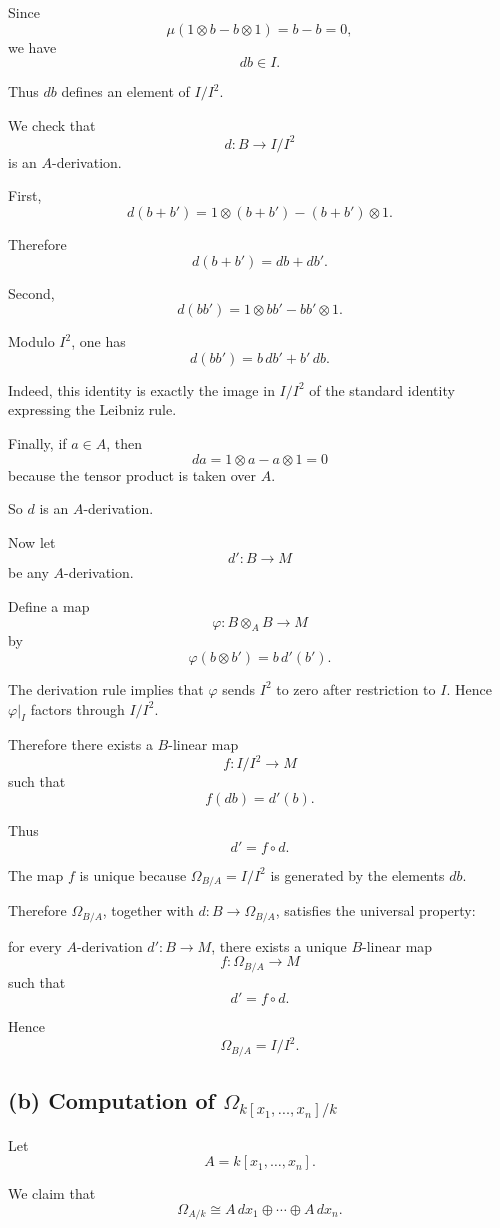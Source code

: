 \documentclass[12pt,a4paper]{article}
\theoremstyle{notespace}
\begin{document}
Since
\[
\mu(1\otimes b-b\otimes1)=b-b=0,
\]
we have
\[
db\in I.
\]

Thus \(db\) defines an element of \(I/I^2\).

We check that
\[
d:B\to I/I^2
\]
is an \(A\)-derivation.

First,
\[
d(b+b')
=
1\otimes(b+b')-(b+b')\otimes1.
\]

Therefore
\[
d(b+b')=db+db'.
\]

Second,
\[
d(bb')
=
1\otimes bb'-bb'\otimes1.
\]

Modulo \(I^2\), one has
\[
d(bb')=b\,db'+b'\,db.
\]

Indeed, this identity is exactly the image in \(I/I^2\) of the standard
identity expressing the Leibniz rule.

Finally, if \(a\in A\), then
\[
da=1\otimes a-a\otimes1=0
\]
because the tensor product is taken over \(A\).

So \(d\) is an \(A\)-derivation.

Now let
\[
d':B\to M
\]
be any \(A\)-derivation.

Define a map
\[
\varphi:B\otimes_A B\to M
\]
by
\[
\varphi(b\otimes b')=b\,d'(b').
\]

The derivation rule implies that \(\varphi\) sends \(I^2\) to zero after
restriction to \(I\). Hence \(\varphi|_I\) factors through \(I/I^2\).

Therefore there exists a \(B\)-linear map
\[
f:I/I^2\to M
\]
such that
\[
f(db)=d'(b).
\]

Thus
\[
d'=f\circ d.
\]

The map \(f\) is unique because \(\Omega_{B/A}=I/I^2\) is generated by the
elements \(db\).

Therefore \(\Omega_{B/A}\), together with \(d:B\to\Omega_{B/A}\), satisfies
the universal property:

for every \(A\)-derivation \(d':B\to M\), there exists a unique \(B\)-linear
map
\[
f:\Omega_{B/A}\to M
\]
such that
\[
d'=f\circ d.
\]

Hence
\[
\boxed{
	\Omega_{B/A}=I/I^2.
}
\]

\subsection*{(b) Computation of \(\Omega_{k[x_1,\ldots,x_n]/k}\)}

Let
\[
A=k[x_1,\ldots,x_n].
\]

We claim that
\[
\Omega_{A/k}
\cong
A\,dx_1\oplus\cdots\oplus A\,dx_n.
\]
\end{document}
